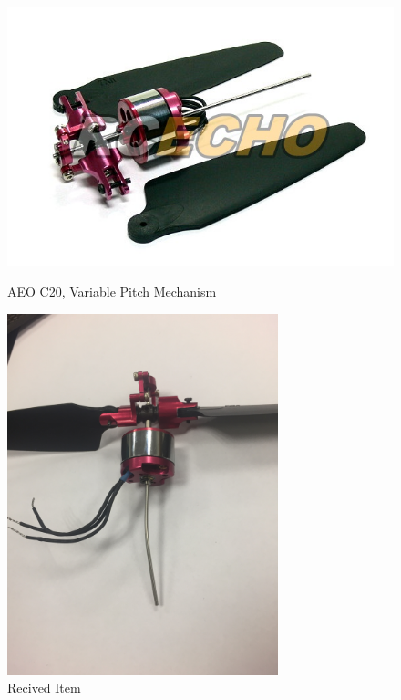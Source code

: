 \begin{figure}[h]
         \begin{minipage}[b]{0.4\textwidth}
         \centering
            \includegraphics[width = 1\textwidth]{VAPIQ-PICTURES/VPitchAeoc20}
              \caption{AEO C20, Variable Pitch Mechanism}
            \label{fig:vpm}
        \end{minipage}
        \hfill
        \begin{minipage}[b]{0.4\textwidth}
        \centering
            \includegraphics[width = 0.7\textwidth]{VAPIQ-PICTURES/File_004}
            \caption{Recived Item}
            \label{fig:VPQHobbyking}
        \end{minipage}
\end{figure}
